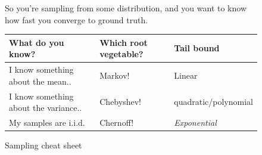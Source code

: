 \documentclass[11pt]{article}
\begin{document}
    \begin{figure}[H]
      So you're sampling from some distribution, and you want to know how fast
      you converge to ground truth.

      \begin{tabular}{lll}
        What do you know? & Which root vegetable? & Tail bound\\
        \hline
        I know something about the mean..  & Markov! & Linear \\
        I know something about the variance..  & Chebyshev! & quadratic/polynomial\\
        My samples are i.i.d.  & Chernoff! & \emph{Exponential}\\
        \hline
      \end{tabular}
      \caption{Sampling cheat sheet}
      \label{fig:bounds}
    \end{figure}


{}

\end{document}
